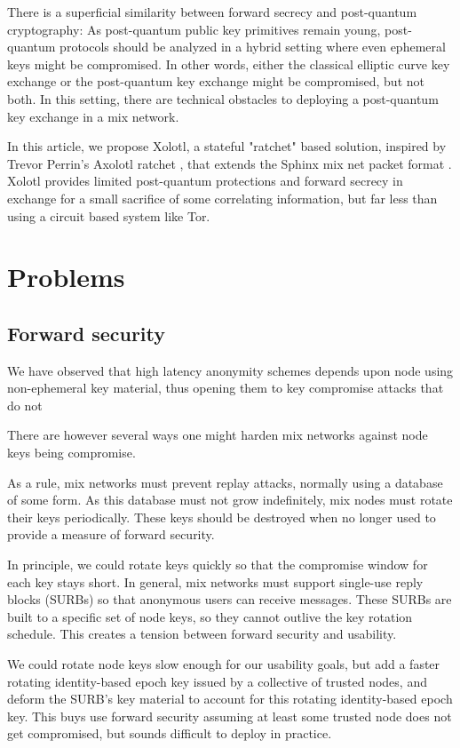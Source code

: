 \documentclass[twoside,letterpaper]{llncs}
\begin{document}
There is a superficial similarity between forward secrecy and
post-quantum cryptography:  As post-quantum public key primitives
remain young, post-quantum protocols should be analyzed in a hybrid
setting where even ephemeral keys might be compromised.  
In other words, either the classical elliptic curve key exchange or
the post-quantum key exchange might be compromised, but not both. 
In this setting, there are technical obstacles to deploying a
post-quantum key exchange in a mix network.  

In this article, we propose Xolotl, a stateful "ratchet" based
solution, inspired by Trevor Perrin's Axolotl ratchet \cite{Axolotl},
that extends the Sphinx mix net packet format \cite{Sphinx}.
Xolotl provides limited post-quantum protections and forward secrecy
in exchange for a small sacrifice of some correlating information,
but far less than using a circuit based system like Tor.


\section{Problems} %

\subsection{Forward security}

We have observed that high latency anonymity schemes depends upon
node using non-ephemeral key material, thus opening them to key
compromise attacks that do not

There are however several ways one might harden mix networks against node
keys being compromise. 

As a rule, mix networks must prevent replay attacks, normally using
a database of some form.  As this database must not grow indefinitely,
mix nodes must rotate their keys periodically.  These keys should be
destroyed when no longer used to provide a measure of forward security.

In principle, we could rotate keys quickly so that the compromise
window for each key stays short.  In general, mix networks must
support single-use reply blocks (SURBs) so that anonymous users can
receive messages.  These SURBs are built to a specific set of node
keys, so they cannot outlive the key rotation schedule.  This creates
a tension between forward security and usability.

We could rotate node keys slow enough for our usability goals, but add
a faster rotating identity-based epoch key issued by a collective of
trusted nodes, and deform the SURB's key material to account for this
rotating identity-based epoch key.  This buys use forward security
assuming at least some trusted node does not get compromised, but
sounds difficult to deploy in practice. 
\end{document}
